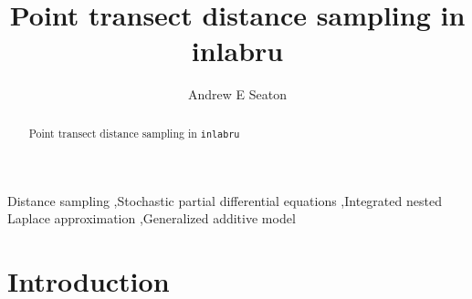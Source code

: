 \documentclass[preprint,12pt]{elsarticle}
\begin{document}
\begin{frontmatter}
\title{Point transect distance sampling in inlabru}




\author{Andrew E Seaton}

\address{Centre for Research into Ecological \& Environmental Modelling and School of Mathematics \& Statistics, University of St Andrews, St Andrews, Fife, Scotland}

\begin{abstract}
Point transect distance sampling in \texttt{inlabru}
\end{abstract}

\begin{keyword}
Distance sampling \sep Stochastic partial differential equations \sep Integrated nested Laplace approximation \sep Generalized additive model
\end{keyword}
\end{frontmatter}

\section*{Introduction}
\end{document}
